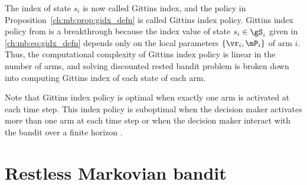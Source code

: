 The index of state $s_i$ is now called Gittins index, and the policy in Proposition~\ref{ch:mb:prop:gidx_defn} is called Gittins index policy.
Gittins index policy from \cite{gittins1979bandit} is a breakthrough because the index value of state $s_i\in\gS_i$ given in \eqref{ch:mb:eq:gidx_defn} depends only on the local parameters $\{\vr_i,\mP_i\}$ of arm $i$.
Thus, the computational complexity of Gittins index policy is linear in the number of arms, and solving discounted rested bandit problem is broken down into computing Gittins index of each state of each arm.

Note that Gittins index policy is optimal when exactly one arm is activated at each time step.
This index policy is suboptimal when the decision maker activates more than one arm at each time step or when the decision maker interact with the bandit over a finite horizon \cite{gittins2011multi}.


\section{Restless Markovian bandit}
\label{ch:mb:sec:restless}



